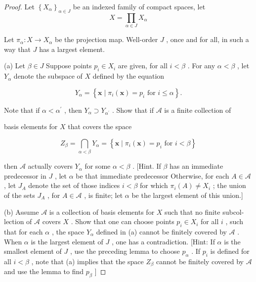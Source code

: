 \begin{proof}Let \({\left\{  {X}_{\alpha }\right\}  }_{\alpha  \in  J}\) be an indexed family of compact spaces, let
\[
X = \mathop{\prod }\limits_{{\alpha  \in  J}}{X}_{\alpha }
\]

Let \({\pi }_{\alpha } : X \rightarrow  {X}_{\alpha }\) be the projection map. Well-order \(J\) , once and for all, in such a way that \(J\) has a largest element.

(a) Let \(\beta  \in  J\) Suppose points \({p}_{i} \in  {X}_{i}\) are given, for all \(i < \beta\) . For any \(\alpha  < \beta\) , let \({Y}_{\alpha }\) denote the subspace of \(X\) defined by the equation

\[
{Y}_{\alpha } = \left\{  {\mathbf{x} \mid  {\pi }_{i}\left( \mathbf{x}\right)  = {p}_{i}\text{ for }i \leq  \alpha }\right\}  .
\]

Note that if \(\alpha  < {\alpha }^{\prime }\) , then \({Y}_{\alpha } \supset  {Y}_{{\alpha }^{\prime }}\) . Show that if \(\mathcal{A}\) is a finite collection of

basis elements for \(X\) that covers the space

\[
{Z}_{\beta } = \mathop{\bigcap }\limits_{{\alpha  < \beta }}{Y}_{\alpha } = \left\{  {\mathbf{x} \mid  {\pi }_{i}\left( \mathbf{x}\right)  = {p}_{i}\text{ for }i < \beta }\right\}
\]

then \(\mathcal{A}\) actually covers \({Y}_{\alpha }\) for some \(\alpha  < \beta\) . [Hint. If \(\beta\) has an immediate predecessor in \(J\) , let \(\alpha\) be that immediate predecessor Otherwise, for each \(A \in  \mathcal{A}\) , let \({J}_{A}\) denote the set of those indices \(i < \beta\) for which \({\pi }_{i}\left( A\right)  \neq  {X}_{i}\) ; the union of the sets \({J}_{A}\) , for \(A \in  \mathcal{A}\) , is finite; let \(\alpha\) be the largest element of this union.]

(b) Assume \(\mathcal{A}\) is a collection of basis elements for \(X\) such that no finite subcol-lection of \(\mathcal{A}\) covers \(X\) . Show that one can choose points \({p}_{i} \in  {X}_{i}\) for all \(i\) , such that for each \(\alpha\) , the space \({Y}_{\alpha }\) defined in (a) cannot be finitely covered by \(\mathcal{A}\) . When \(\alpha\) is the largest element of \(J\) , one has a contradiction. [Hint: If \(\alpha\) is the smallest element of \(J\) , use the preceding lemma to choose \({p}_{\alpha }\) . If \({p}_{i}\) is defined for all \(i < \beta\) , note that (a) implies that the space \({Z}_{\beta }\) cannot be finitely covered by \(\mathcal{A}\) and use the lemma to find \({p}_{\beta }\) ]
\end{proof}
